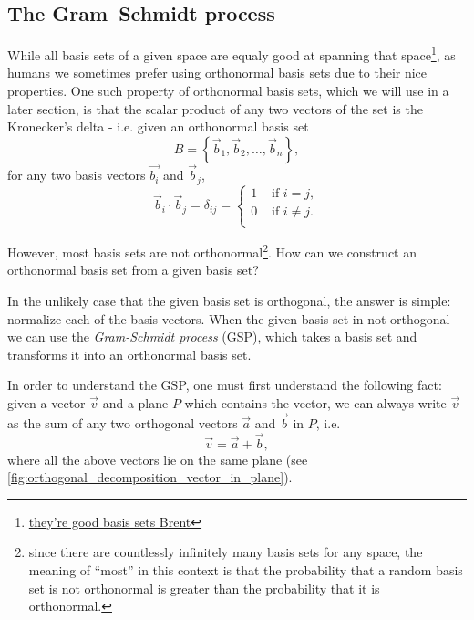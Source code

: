 \subsection{The Gram–Schmidt process}
While all basis sets of a given space are equaly good at spanning that space\footnote{\href{https://knowyourmeme.com/memes/theyre-good-dogs-brent}{they're good basis sets Brent}}, as humans we sometimes prefer using orthonormal basis sets due to their nice properties. One such property of orthonormal basis sets, which we will use in a later section, is that the scalar product of any two vectors of the set is the Kronecker's delta - i.e. given an orthonormal basis set
\[
	B=\left\{\vec{b}_{1},\vec{b}_{2},\dots,\vec{b}_{n}\right\},
\]
for any two basis vectors $\vec{b_{i}}$ and $\vec{b}_{j}$,
\[
	\vec{b}_{i} \cdot \vec{b}_{j} = \delta_{ij} =
	\begin{cases}
		1 &\text{ if } i=j,\\
		0 &\text{ if } i\neq j.\\
	\end{cases}
\]

However, most basis sets are not orthonormal\footnote{since there are countlessly infinitely many basis sets for any space, the meaning of ``most'' in this context is that the probability that a random basis set is not orthonormal is greater than the probability that it is orthonormal.}. How can we construct an orthonormal basis set from a given basis set?

In the unlikely case that the given basis set is orthogonal, the answer is simple: normalize each of the basis vectors. When the given basis set in not orthogonal we can use the \emph{Gram-Schmidt process} (GSP), which takes a basis set and transforms it into an orthonormal basis set.

In order to understand the GSP, one must first understand the following fact: given a vector $\vec{v}$ and a plane $P$ which contains the vector, we can always write $\vec{v}$ as the sum of any two orthogonal vectors $\vec{a}$ and $\vec{b}$ in $P$, i.e.
\begin{equation}
	\vec{v} = \vec{a} + \vec{b},
	\label{eq:simple_vector_sum}
\end{equation}
where all the above vectors lie on the same plane (see \autoref{fig:orthogonal_decomposition_vector_in_plane}).

